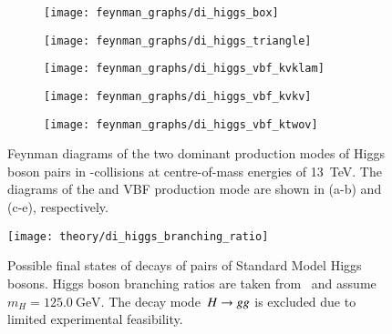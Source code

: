 \begin{figure}[htbp]
  \centering

  \begin{subfigure}{0.49\textwidth}
    \centering
    \texttt{[image: feynman\_graphs/di\_higgs\_box]}
    \subcaption{}
  \end{subfigure}\hfill%
  \begin{subfigure}{0.49\textwidth}
    \centering
    \texttt{[image: feynman\_graphs/di\_higgs\_triangle]}
    \subcaption{}
  \end{subfigure}

  \vspace*{1em}

  \begin{subfigure}{0.33\textwidth}
    \centering
    \texttt{[image: feynman\_graphs/di\_higgs\_vbf\_kvklam]}
    \subcaption{}
  \end{subfigure}\hfill%
  \begin{subfigure}{0.33\textwidth}
    \centering
    \texttt{[image: feynman\_graphs/di\_higgs\_vbf\_kvkv]}
    \subcaption{}
  \end{subfigure}\hfill%
  \begin{subfigure}{0.33\textwidth}
    \centering
    \texttt{[image: feynman\_graphs/di\_higgs\_vbf\_ktwov]}
    \subcaption{}
  \end{subfigure}

  \caption{Feynman diagrams of the two dominant production modes of Higgs boson
    pairs in \pp-collisions at centre-of-mass energies of \SI{13}{\TeV}.  The
    diagrams of the \ggF and VBF production mode are shown in (a-b) and (c-e),
    respectively.}%
  \label{fig:hh_feynmans}
\end{figure}



\begin{figure}[htbp]
  \centering
  \texttt{[image: theory/di\_higgs\_branching\_ratio]}
  \caption{Possible final states of decays of pairs of Standard Model Higgs
    bosons. Higgs boson branching ratios are taken from~\cite{deFlorian:2016spz}
    and assume~$m_{H} = \SI{125.0}{\GeV}$. The decay mode~$H \rightarrow g g$ is
    excluded due to limited experimental feasibility.}
  \label{fig:hh_branching_ratios}
\end{figure}



\clearpage
{}


